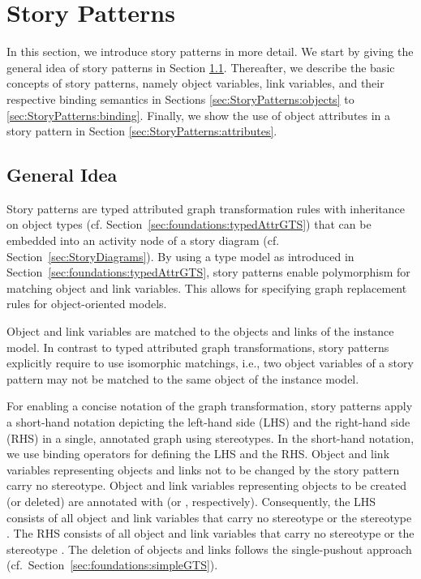 \section{Story Patterns} 
\label{sec:StoryPatterns}

In this section, we introduce story patterns in more detail.
We start by giving the general idea of story patterns in Section \ref{sec:StoryPatterns:storyPattern}.
Thereafter, we describe the basic concepts of story patterns, namely object variables, link variables,
and their respective binding semantics in Sections \ref{sec:StoryPatterns:objects} to \ref{sec:StoryPatterns:binding}.
Finally, we show the use of object attributes in a story pattern in Section \ref{sec:StoryPatterns:attributes}.


\subsection{General Idea}
\label{sec:StoryPatterns:storyPattern}

Story patterns are typed attributed graph transformation rules with inheritance on object types (cf. Section~\ref{sec:foundations:typedAttrGTS}) that can be embedded into an activity node of a story diagram (cf. Section~\ref{sec:StoryDiagrams}).
 By using a type model as introduced in Section~\ref{sec:foundations:typedAttrGTS}, story patterns enable polymorphism for matching object and link variables.
This allows for specifying graph replacement rules for object-oriented models.

Object and link variables are matched to the objects and links of the instance model. 
In contrast to typed attributed graph transformations, story patterns explicitly require to use isomorphic matchings, i.e., two object variables of a story pattern may not be matched to the same object of the instance model.

For enabling a concise notation of the graph transformation, story patterns apply a short-hand notation depicting the left-hand side (LHS) and the right-hand side (RHS) in a single, annotated graph using stereotypes.
In the short-hand notation, we use binding operators for defining the LHS and the RHS. Object and link variables representing objects and links not to be changed by the story pattern carry no stereotype. 
Object and link variables representing objects to be created (or deleted) are annotated with \create (or  \destroy, respectively). 
Consequently, the LHS consists of all object and link variables that carry no stereotype or the stereotype \destroy. The RHS consists of all object and link variables that carry no stereotype or the stereotype \create.
The deletion of objects and links follows the single-pushout approach (cf.\ Section~\ref{sec:foundations:simpleGTS}).

